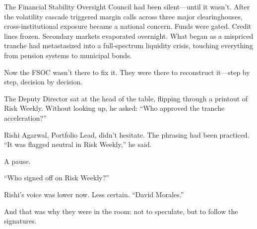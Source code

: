 \medskip

The Financial Stability Oversight Council had been silent—until it wasn’t.
After the volatility cascade triggered margin calls across three major clearinghouses, cross-institutional exposure became a national concern.
Funds were gated. Credit lines frozen. Secondary markets evaporated overnight.
What began as a mispriced tranche had metastasized into a full-spectrum liquidity crisis, touching everything from pension systems to municipal bonds.

Now the FSOC wasn’t there to fix it.
They were there to reconstruct it—step by step, decision by decision.

The Deputy Director sat at the head of the table, flipping through a printout of Risk Weekly.
Without looking up, he asked:
“Who approved the tranche acceleration?”

Rishi Agarwal, Portfolio Lead, didn’t hesitate. The phrasing had been practiced.
“It was flagged neutral in Risk Weekly,” he said.

A pause.

“Who signed off on Risk Weekly?”

Rishi’s voice was lower now. Less certain.
“David Morales.”

And that was why they were in the room: not to speculate, but to follow the signatures.

\medskip

